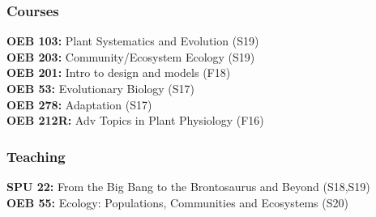 \documentclass[11pt]{article}\usepackage[]{graphicx}\usepackage[]{color}
\begin{document}
\subsubsection*{Courses}
\textbf{OEB 103:} Plant Systematics and Evolution (S19)\\
\textbf{OEB 203:} Community/Ecosystem Ecology (S19)\\
\textbf{OEB 201:}	Intro to design and models (F18)\\
\textbf{OEB 53:} Evolutionary Biology (S17)\\
\textbf{OEB 278:} Adaptation (S17)\\
\textbf{OEB 212R:} Adv Topics in Plant Physiology (F16)\\

\subsubsection*{Teaching}
\textbf{SPU 22:} From the Big Bang to the Brontosaurus and Beyond (S18,S19)\\
\textbf{OEB 55:} Ecology: Populations, Communities and Ecosystems (S20)\\
\end{document}
